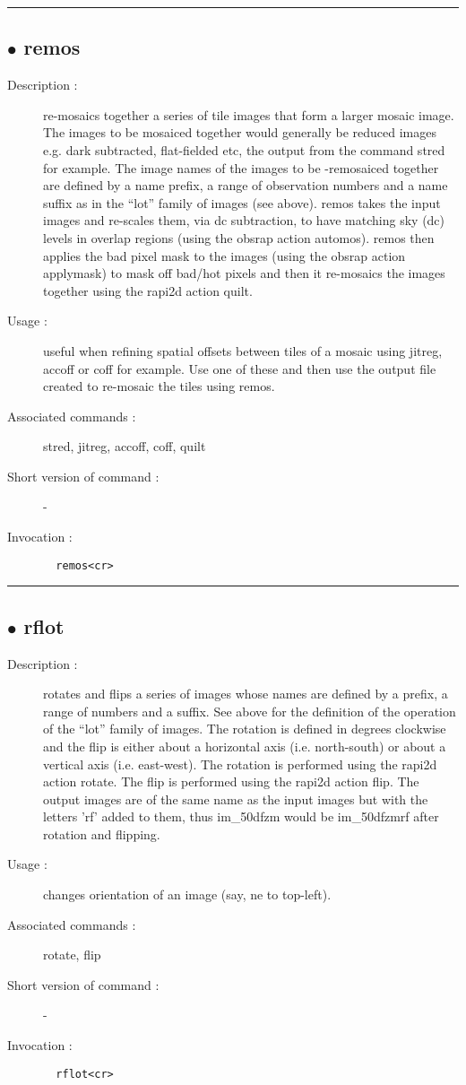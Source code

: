 \hrule \subsection*{$\bullet$ remos}
\begin{description}
\item[Description :] re-mosaics together a series of tile images that form a larger
mosaic image.  The images to be mosaiced together would generally be
reduced images e.g. dark subtracted, flat-fielded etc, the output from
the command stred for example.  The image names of the images to be
-remosaiced together are defined by a name prefix, a range of observation
numbers and a name suffix as in the ``lot'' family of images (see above).
remos takes the input images and re-scales them, via dc subtraction, to
have matching sky (dc) levels in overlap regions (using the obsrap action
automos).  remos then applies the bad pixel mask to the images (using the
obsrap action applymask) to mask off bad/hot pixels and then it
re-mosaics the images together using the rapi2d action quilt.
\item[Usage :] useful when refining spatial offsets between tiles of a mosaic
using jitreg, accoff or coff for example.  Use one of these and then use
the output file created to re-mosaic the tiles using remos.
\item[Associated commands :] stred, jitreg, accoff, coff, quilt
\item[Short version of command :] -
\item[Invocation :]

\verb+  remos<cr> +\end{description}

\hrule \subsection*{$\bullet$ rflot}
\begin{description}
\item[Description :] rotates and flips a series of images whose names are defined by a
prefix, a range of numbers and a suffix. See above for the definition of
the operation of the ``lot'' family of images.  The rotation is defined in
degrees clockwise and the flip is either about a horizontal axis (i.e.
north-south) or about a vertical axis (i.e. east-west).  The rotation is
performed using the rapi2d action rotate.  The flip is performed using
the rapi2d action flip.  The output images are of the same name as the
input images but with the letters 'rf' added to them, thus im\_50dfzm
would be im\_50dfzmrf after rotation and flipping.
\item[Usage :] changes orientation of an image (say, ne to top-left).
\item[Associated commands :] rotate, flip
\item[Short version of command :] -
\item[Invocation :]

\verb+  rflot<cr> +\end{description}

